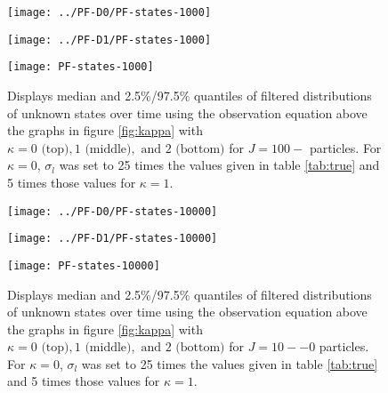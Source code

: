 \documentclass{article}
\begin{document}
\begin{figure}[ht]
\begin{minipage}{1.0\linewidth}
\texttt{[image: ../PF-D0/PF-states-1000]}
\end{minipage}
\begin{minipage}{1.0\linewidth}
\texttt{[image: ../PF-D1/PF-states-1000]}
\end{minipage}
\begin{minipage}{1.0\linewidth}
\texttt{[image: PF-states-1000]}
\end{minipage}
\caption{Displays median and 2.5\%/97.5\% quantiles of filtered distributions of unknown states over time using the observation equation above the graphs in figure \ref{fig:kappa} with $\kappa = 0 \mbox{ (top)}, 1 \mbox{ (middle)}, \mbox{ and } 2 \mbox{ (bottom)}$ for $J = 100-$ particles. For $\kappa = 0$, $\sigma_l$ was set to 25 times the values given in table \ref{tab:true} and 5 times those values for $\kappa = 1$.}
\end{figure}

\begin{figure}[ht]
\begin{minipage}{1.0\linewidth}
\texttt{[image: ../PF-D0/PF-states-10000]}
\end{minipage}
\begin{minipage}{1.0\linewidth}
\texttt{[image: ../PF-D1/PF-states-10000]}
\end{minipage}
\begin{minipage}{1.0\linewidth}
\texttt{[image: PF-states-10000]}
\end{minipage}
\caption{Displays median and 2.5\%/97.5\% quantiles of filtered distributions of unknown states over time using the observation equation above the graphs in figure \ref{fig:kappa} with $\kappa = 0 \mbox{ (top)}, 1 \mbox{ (middle)}, \mbox{ and } 2 \mbox{ (bottom)}$ for $J = 10--0$ particles. For $\kappa = 0$, $\sigma_l$ was set to 25 times the values given in table \ref{tab:true} and 5 times those values for $\kappa = 1$.}
\end{figure}
\end{document}
